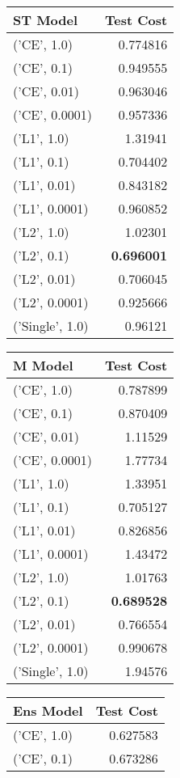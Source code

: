 \begin{tabular}{lr}
\hline
 ST Model        &   Test Cost \\
\hline
 ('CE', 1.0)     &    0.774816 \\
 ('CE', 0.1)     &    0.949555 \\
 ('CE', 0.01)    &    0.963046 \\
 ('CE', 0.0001)  &    0.957336 \\
 ('L1', 1.0)     &    1.31941  \\
 ('L1', 0.1)     &    0.704402 \\
 ('L1', 0.01)    &    0.843182 \\
 ('L1', 0.0001)  &    0.960852 \\
 ('L2', 1.0)     &    1.02301  \\
 ('L2', 0.1)     &    {\bf 0.696001} \\
 ('L2', 0.01)    &    0.706045 \\
 ('L2', 0.0001)  &    0.925666 \\
 ('Single', 1.0) &    0.96121  \\
\hline
\end{tabular}\begin{tabular}{lr}
\hline
 M Model         &   Test Cost \\
\hline
 ('CE', 1.0)     &    0.787899 \\
 ('CE', 0.1)     &    0.870409 \\
 ('CE', 0.01)    &    1.11529  \\
 ('CE', 0.0001)  &    1.77734  \\
 ('L1', 1.0)     &    1.33951  \\
 ('L1', 0.1)     &    0.705127 \\
 ('L1', 0.01)    &    0.826856 \\
 ('L1', 0.0001)  &    1.43472  \\
 ('L2', 1.0)     &    1.01763  \\
 ('L2', 0.1)     &    {\bf 0.689528} \\
 ('L2', 0.01)    &    0.766554 \\
 ('L2', 0.0001)  &    0.990678 \\
 ('Single', 1.0) &    1.94576  \\
\hline
\end{tabular}\begin{tabular}{lr}
\hline
 Ens Model       &   Test Cost \\
\hline
 ('CE', 1.0)     &    0.627583 \\
 ('CE', 0.1)     &    0.673286 \\

\end{tabular}
